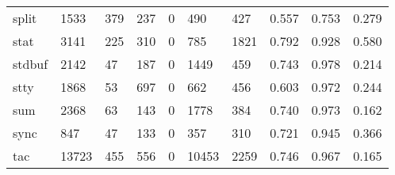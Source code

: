 \begin{longtable}{lp{2.0cm}p{2.0cm}p{2.0cm}p{2.0cm}p{2.0cm}p{2.0cm}p{2.0cm}p{2.0cm}p{2.0cm}}
split     &                   1533 &                                379 &                               237 &                                0 &                               490 &                             427 &                                   0.557 &                                  0.753 &                                0.279 \\
stat      &                   3141 &                                225 &                               310 &                                0 &                               785 &                            1821 &                                   0.792 &                                  0.928 &                                0.580 \\
stdbuf    &                   2142 &                                 47 &                               187 &                                0 &                              1449 &                             459 &                                   0.743 &                                  0.978 &                                0.214 \\
stty      &                   1868 &                                 53 &                               697 &                                0 &                               662 &                             456 &                                   0.603 &                                  0.972 &                                0.244 \\
sum       &                   2368 &                                 63 &                               143 &                                0 &                              1778 &                             384 &                                   0.740 &                                  0.973 &                                0.162 \\
sync      &                    847 &                                 47 &                               133 &                                0 &                               357 &                             310 &                                   0.721 &                                  0.945 &                                0.366 \\
tac       &                  13723 &                                455 &                               556 &                                0 &                             10453 &                            2259 &                                   0.746 &                                  0.967 &                                0.165 \\

\end{longtable}

